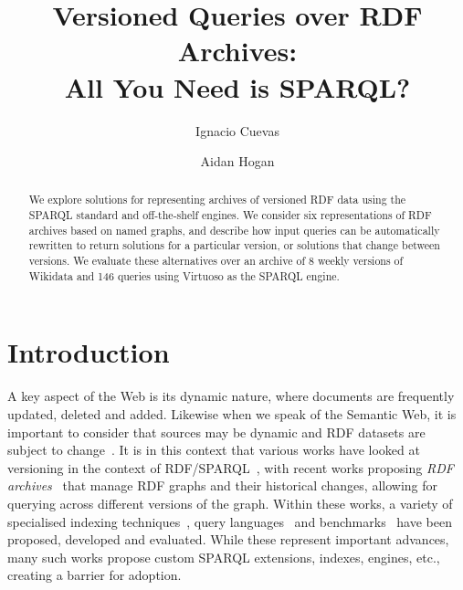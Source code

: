 \documentclass{llncs}
\begin{document}
\title{Versioned Queries over RDF Archives:\\All You Need is SPARQL?}

\author{Ignacio Cuevas \and Aidan Hogan}

\maketitle

\begin{abstract}
We explore solutions for representing archives of versioned RDF data using the SPARQL standard and off-the-shelf engines. We consider six representations of RDF archives based on named graphs, and describe how input queries can be automatically rewritten to return solutions for a particular version, or solutions that change between versions. We evaluate these alternatives over an archive of 8 weekly versions of Wikidata and 146 queries using Virtuoso as the SPARQL engine.
\end{abstract}


\section{Introduction}

A key aspect of the Web is its dynamic nature, where documents are frequently updated, deleted and added. Likewise when we speak of the Semantic Web, it is important to consider that sources may be dynamic and RDF datasets are subject to change~\cite{KaferAUOH13}. It is in this context that various works have looked at versioning in the context of RDF/SPARQL~\cite{VolkelG06,TappoletB09,Grandi10,GraubeHU14,KhuranaD16}, with recent works proposing \textit{RDF archives}~\cite{FernandezPU15,Cerdeira-PenaFF16,BahriLA18,FernandezUPK19,TaelmanSHMV19} that manage RDF graphs and their historical changes, allowing for querying across different versions of the graph. Within these works, a variety of specialised indexing techniques~\cite{Cerdeira-PenaFF16,BahriLA18,TaelmanSHMV19}, query languages~\cite{TappoletB09} and benchmarks~\cite{KotsevMPEFK16,FernandezUPK19} have been proposed, developed and evaluated. While these represent important advances, many such works propose custom SPARQL extensions, indexes, engines, etc., creating a barrier for adoption.
\end{document}
